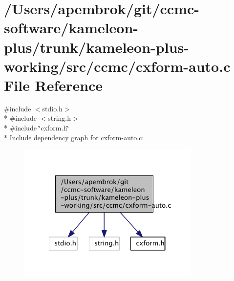 \hypertarget{cxform-auto_8c}{\section{/\-Users/apembrok/git/ccmc-\/software/kameleon-\/plus/trunk/kameleon-\/plus-\/working/src/ccmc/cxform-\/auto.c File Reference}
\label{cxform-auto_8c}
}
{\ttfamily \#include $<$stdio.\-h$>$}\\*
{\ttfamily \#include $<$string.\-h$>$}\\*
{\ttfamily \#include \char`\"{}cxform.\-h\char`\"{}}\\*
Include dependency graph for cxform-\/auto.c\-:\nopagebreak
\begin{figure}[H]
\begin{center}
\leavevmode
\includegraphics[width=257pt]{cxform-auto_8c__incl}
\end{center}
\end{figure}
